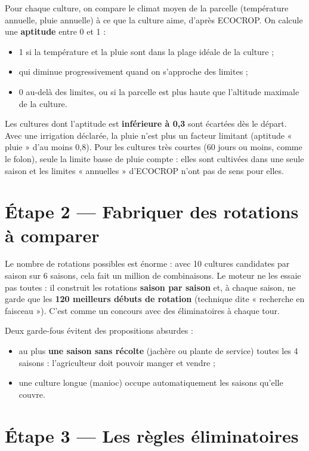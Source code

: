 \documentclass[11pt,a4paper]{article}
\begin{document}
Pour chaque culture, on compare le climat moyen de la parcelle (température annuelle, pluie annuelle) à ce que la
culture aime, d'après ECOCROP. On calcule une \textbf{aptitude} entre 0 et 1 :

\begin{itemize}
\item 1 si la température et la pluie sont dans la plage idéale de la culture ;
\item qui diminue progressivement quand on s'approche des limites ;
\item 0 au-delà des limites, ou si la parcelle est plus haute que l'altitude maximale de la culture.
\end{itemize}

Les cultures dont l'aptitude est \textbf{inférieure à 0,3} sont écartées dès le départ. Avec une irrigation
déclarée, la pluie n'est plus un facteur limitant (aptitude « pluie » d'au moins 0,8). Pour les cultures très
courtes (60 jours ou moins, comme le folon), seule la limite basse de pluie compte : elles sont cultivées dans une
seule saison et les limites « annuelles » d'ECOCROP n'ont pas de sens pour elles.

\section{Étape 2 — Fabriquer des rotations à comparer}

Le nombre de rotations possibles est énorme : avec 10 cultures candidates par saison sur 6 saisons, cela fait un
million de combinaisons. Le moteur ne les essaie pas toutes : il construit les rotations \textbf{saison par
saison} et, à chaque saison, ne garde que les \textbf{120 meilleurs débuts de rotation} (technique dite « recherche
en faisceau »). C'est comme un concours avec des éliminatoires à chaque tour.

Deux garde-fous évitent des propositions absurdes :
\begin{itemize}
\item au plus \textbf{une saison sans récolte} (jachère ou plante de service) toutes les 4 saisons : l'agriculteur doit pouvoir manger et vendre ;
\item une culture longue (manioc) occupe automatiquement les saisons qu'elle couvre.
\end{itemize}

\section{Étape 3 — Les règles éliminatoires}
\end{document}
